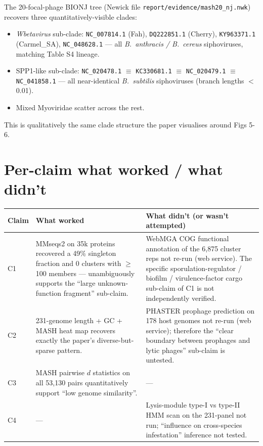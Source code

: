 \documentclass[11pt]{article}
\begin{document}
The 20-focal-phage BIONJ tree (Newick file \texttt{report/evidence/mash20\_nj.nwk}) recovers three quantitatively-visible clades:
\begin{itemize}
    \item \emph{Wbetavirus} sub-clade: \texttt{NC\_007814.1} (Fah), \texttt{DQ222851.1} (Cherry), \texttt{KY963371.1} (Carmel\_SA), \texttt{NC\_048628.1} --- all \emph{B.\ anthracis / B.\ cereus} siphoviruses, matching Table S4 lineage.
    \item SPP1-like sub-clade: \texttt{NC\_020478.1} $\equiv$ \texttt{KC330681.1} $\equiv$ \texttt{NC\_020479.1} $\equiv$ \texttt{NC\_041858.1} --- all near-identical \emph{B.\ subtilis} siphoviruses (branch lengths $<$ 0.01).
    \item Mixed Myoviridae scatter across the rest.
\end{itemize}

This is qualitatively the same clade structure the paper visualises around Figs 5-6.

\section{Per-claim what worked / what didn't}

\begin{longtable}{@{}p{1cm}p{7cm}p{7cm}@{}}
\toprule
Claim & What worked & What didn't (or wasn't attempted) \\
\midrule
C1 & MMseqs2 on 35k proteins recovered a 49\% singleton fraction and 0 clusters with $\geq$100 members --- unambiguously supports the ``large unknown-function fragment'' sub-claim. & WebMGA COG functional annotation of the 6{,}875 cluster reps not re-run (web service). The specific sporulation-regulator / biofilm / virulence-factor cargo sub-claim of C1 is not independently verified. \\
C2 & 231-genome length + GC + MASH heat map recovers exactly the paper's diverse-but-sparse pattern. & PHASTER prophage prediction on 178 host genomes not re-run (web service); therefore the ``clear boundary between prophages and lytic phages'' sub-claim is untested. \\
C3 & MASH pairwise $d$ statistics on all 53,130 pairs quantitatively support ``low genome similarity''. & --- \\
C4 & --- & Lysis-module type-I vs type-II HMM scan on the 231-panel not run; ``influence on cross-species infestation'' inference not tested. \\
\bottomrule
\end{longtable}
\end{document}
